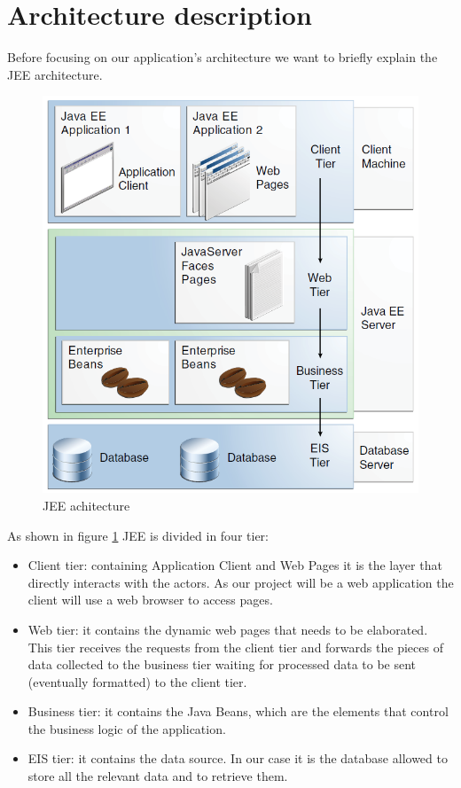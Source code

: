 \documentclass[10pt,a4paper,titlepage]{article}
\begin{document}


\part{Architecture description}
Before focusing on our application's architecture we want to briefly explain the JEE architecture.

\begin{figure}[h]
\centering
\includegraphics[width=\linewidth]{./JEE-arch}
\caption[JEE architecture]{JEE achitecture}
\label{fig:JEE-arch}
\end{figure}

As shown in figure \ref{fig:JEE-arch} JEE is divided in four tier:
\begin{itemize}
\item Client tier: containing Application Client and Web Pages it is the layer that directly interacts with the actors. As our project will be a web application the client will use a web browser to access pages.
\item Web tier: it contains the dynamic web pages that needs to be elaborated. This tier receives the requests from the client tier and forwards the pieces of data collected to the business tier waiting for processed data to be sent (eventually formatted) to the client tier.
\item Business tier: it contains the Java Beans, which are the elements that control the business logic of the application.
\item EIS tier: it contains the data source. In our case it is the database allowed to store all the relevant data and to retrieve them.
\end{itemize}
\end{document}
